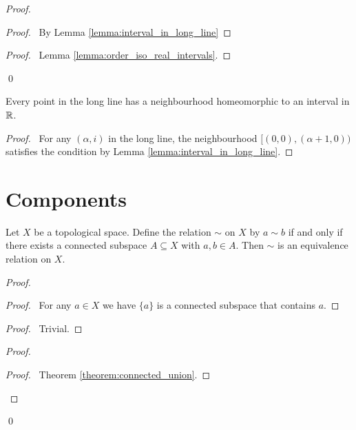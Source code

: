 \begin{proof}
    \pf
    \step{2}{\pflet{$(\alpha,i),(\beta,j) \in \omega_1 \times [0,1)$}}
    \step{3}{$[(0,0),(\beta + 1, 0)) \cong [0,1)$}
    \begin{proof}
        \pf\ By Lemma \ref{lemma:interval_in_long_line}
    \end{proof}
    \step{4}{$[(\alpha,i),(\beta,j)) \cong [0,1)$}
    \begin{proof}
        \pf\ Lemma \ref{lemma:order_iso_real_intervals}.
    \end{proof}
    \step{5}{\pick\ a homeomorphism $q : [0,1) \rightarrow [(\alpha,i),(\beta,j))$}
    \qed
\end{proof}

\begin{proposition}
    Every point in the long line has a neighbourhood homeomorphic to an interval in $\mathbb{R}$.
\end{proposition}

\begin{proof}
    \pf\ For any $(\alpha, i)$ in the long line, the neighbourhood $[(0,0),(\alpha + 1, 0))$
    satisfies the condition by Lemma \ref{lemma:interval_in_long_line}.
\end{proof}

\section{Components}

\begin{proposition}
    Let $X$ be a topological space. Define the relation $\sim$ on $X$ by
    $a \sim b$ if and only if there exists a connected subspace $A \subseteq X$
    with $a, b \in A$. Then $\sim$ is an equivalence relation on $X$.
\end{proposition}

\begin{proof}
    \pf
    \begin{proof}
        \pf\ For any $a \in X$ we have $\{a\}$ is a connected subspace that
        contains $a$.
    \end{proof}
    \begin{proof}
        \pf\ Trivial.
    \end{proof}
    \begin{proof}
        \begin{proof}
            \pf\ Theorem \ref{theorem:connected_union}.
        \end{proof}
    \end{proof}
    \qed
\end{proof}

